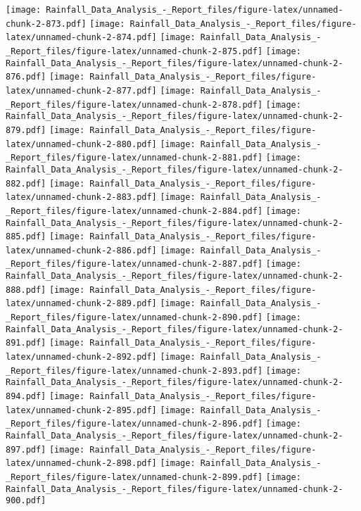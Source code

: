 \documentclass[
]{article}
\begin{document}
\texttt{[image: Rainfall\_Data\_Analysis\_-\_Report\_files/figure-latex/unnamed-chunk-2-873.pdf]}
\texttt{[image: Rainfall\_Data\_Analysis\_-\_Report\_files/figure-latex/unnamed-chunk-2-874.pdf]}
\texttt{[image: Rainfall\_Data\_Analysis\_-\_Report\_files/figure-latex/unnamed-chunk-2-875.pdf]}
\texttt{[image: Rainfall\_Data\_Analysis\_-\_Report\_files/figure-latex/unnamed-chunk-2-876.pdf]}
\texttt{[image: Rainfall\_Data\_Analysis\_-\_Report\_files/figure-latex/unnamed-chunk-2-877.pdf]}
\texttt{[image: Rainfall\_Data\_Analysis\_-\_Report\_files/figure-latex/unnamed-chunk-2-878.pdf]}
\texttt{[image: Rainfall\_Data\_Analysis\_-\_Report\_files/figure-latex/unnamed-chunk-2-879.pdf]}
\texttt{[image: Rainfall\_Data\_Analysis\_-\_Report\_files/figure-latex/unnamed-chunk-2-880.pdf]}
\texttt{[image: Rainfall\_Data\_Analysis\_-\_Report\_files/figure-latex/unnamed-chunk-2-881.pdf]}
\texttt{[image: Rainfall\_Data\_Analysis\_-\_Report\_files/figure-latex/unnamed-chunk-2-882.pdf]}
\texttt{[image: Rainfall\_Data\_Analysis\_-\_Report\_files/figure-latex/unnamed-chunk-2-883.pdf]}
\texttt{[image: Rainfall\_Data\_Analysis\_-\_Report\_files/figure-latex/unnamed-chunk-2-884.pdf]}
\texttt{[image: Rainfall\_Data\_Analysis\_-\_Report\_files/figure-latex/unnamed-chunk-2-885.pdf]}
\texttt{[image: Rainfall\_Data\_Analysis\_-\_Report\_files/figure-latex/unnamed-chunk-2-886.pdf]}
\texttt{[image: Rainfall\_Data\_Analysis\_-\_Report\_files/figure-latex/unnamed-chunk-2-887.pdf]}
\texttt{[image: Rainfall\_Data\_Analysis\_-\_Report\_files/figure-latex/unnamed-chunk-2-888.pdf]}
\texttt{[image: Rainfall\_Data\_Analysis\_-\_Report\_files/figure-latex/unnamed-chunk-2-889.pdf]}
\texttt{[image: Rainfall\_Data\_Analysis\_-\_Report\_files/figure-latex/unnamed-chunk-2-890.pdf]}
\texttt{[image: Rainfall\_Data\_Analysis\_-\_Report\_files/figure-latex/unnamed-chunk-2-891.pdf]}
\texttt{[image: Rainfall\_Data\_Analysis\_-\_Report\_files/figure-latex/unnamed-chunk-2-892.pdf]}
\texttt{[image: Rainfall\_Data\_Analysis\_-\_Report\_files/figure-latex/unnamed-chunk-2-893.pdf]}
\texttt{[image: Rainfall\_Data\_Analysis\_-\_Report\_files/figure-latex/unnamed-chunk-2-894.pdf]}
\texttt{[image: Rainfall\_Data\_Analysis\_-\_Report\_files/figure-latex/unnamed-chunk-2-895.pdf]}
\texttt{[image: Rainfall\_Data\_Analysis\_-\_Report\_files/figure-latex/unnamed-chunk-2-896.pdf]}
\texttt{[image: Rainfall\_Data\_Analysis\_-\_Report\_files/figure-latex/unnamed-chunk-2-897.pdf]}
\texttt{[image: Rainfall\_Data\_Analysis\_-\_Report\_files/figure-latex/unnamed-chunk-2-898.pdf]}
\texttt{[image: Rainfall\_Data\_Analysis\_-\_Report\_files/figure-latex/unnamed-chunk-2-899.pdf]}
\texttt{[image: Rainfall\_Data\_Analysis\_-\_Report\_files/figure-latex/unnamed-chunk-2-900.pdf]}
\end{document}
